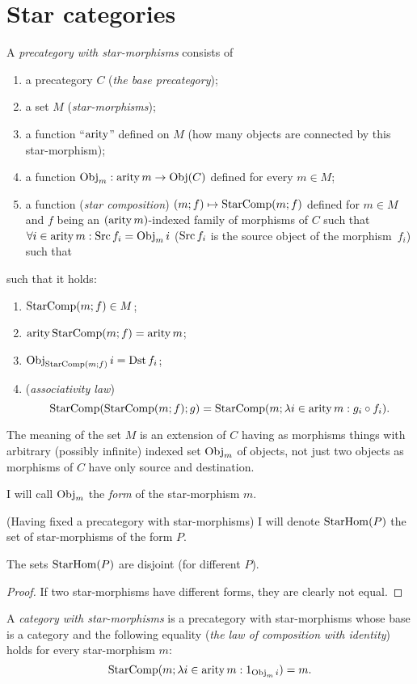 \section{Star categories}
\begin{defn}
A
\emph{precategory with star-morphisms} consists of
\begin{enumerate}
\item a precategory $C$ (\emph{the base precategory});
\item {}a set $M$ (\emph{star-morphisms});
\item a function ``$\operatorname{arity}$'' defined on $M$ (how many objects are connected
by this star-morphism);
\item a function $\operatorname{Obj}_{m}:\operatorname{arity} m\rightarrow\operatorname{Obj}(C)$ defined for every
$m\in M$;
\item {}a function (\emph{star composition}) $(m;f)\mapsto\operatorname{StarComp}(m;f)$
defined for $m\in M$ and $f$ being an $(\operatorname{arity} m)$-indexed family
of morphisms of $C$ such that $\forall i\in\operatorname{arity} m:\operatorname{Src} f_{i}=\operatorname{Obj}_{m}i$
($\operatorname{Src} f_{i}$ is the source object of the morphism~$f_{i}$) such
that
\end{enumerate}
such that it holds:
\begin{enumerate}
\item $\operatorname{StarComp}(m;f)\in M$;
\item $\operatorname{arity}\operatorname{StarComp}(m;f)=\operatorname{arity} m$;
\item $\operatorname{Obj}_{\operatorname{StarComp}(m;f)}i=\operatorname{Dst} f_i$;
\item (\emph{associativity law}) 
\[
\operatorname{StarComp}(\operatorname{StarComp}(m;f);g)=\operatorname{StarComp}(m;\lambda i\in\operatorname{arity} m:g_{i}\circ f_{i}).
\]

\end{enumerate}
\end{defn}
The meaning of the set $M$ is an extension of $C$ having as morphisms
things with arbitrary (possibly infinite) indexed set $\operatorname{Obj}_{m}$
of objects, not just two objects as morphisms of $C$ have only source
and destination.
\begin{defn}
I will call $\operatorname{Obj}_{m}$ the \emph{form}
of the star-morphism $m$.
\end{defn}
(Having fixed a precategory with star-morphisms) I will denote $\operatorname{StarHom}(P)$
the set of star-morphisms of the form $P$.
\begin{prop}
The sets $\operatorname{StarHom}(P)$ are disjoint (for different $P$).\end{prop}
\begin{proof}
If two star-morphisms have different forms, they are clearly not equal.\end{proof}
\begin{defn}
A \emph{category with star-morphisms}
is a precategory with star-morphisms whose base is a category and
the following equality (\emph{the law of composition with identity})
holds for every star-morphism $m$:
\[
\operatorname{StarComp}(m;\lambda i\in\operatorname{arity} m:1_{\operatorname{Obj}_{m}i})=m.
\]

\end{defn}

